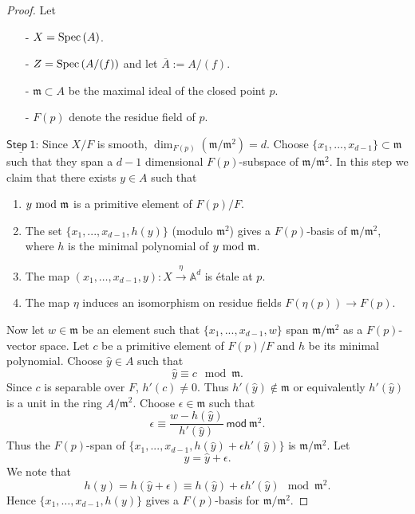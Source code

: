 \documentclass[10pt]{amsart}
\theoremstyle{plain}
\theoremstyle{definition}
\newcommand{\Spec}{{\rm Spec \,}}
\newcommand{\A}{{\mathbb A}}
\let\syn\mathsf
\newcommand{\Step}[1]{\underline{\syn{Step \ {#1}}}}
\newcommand{\scr}{\scriptscriptstyle}
\begin{document}
\begin{proof}   Let
\begin{enumerate}
\item[-] $X=\Spec(A)$.
\item[-] $Z= \Spec(A/(f))$ and let $\overline{A}:= A/(f)$. 
\item[-] $\mathfrak{m}\subset A$ be the maximal ideal of the closed point $p$.
\item[-] $F(p)$ denote the residue field of $p$. 


\end{enumerate}

\noindent $\Step{1}$:
Since $X/F$ is smooth, $\dim_{F(p)}(\mathfrak{m}/\mathfrak{m}^2)=d$. Choose $\{x_{\scr 1},...,x_{\scr d-1}\} \subset {\mathfrak m}$ such that they span a $d-1$ dimensional $F(p)$-subspace of $\mathfrak{m}/\mathfrak{m}^2$. In this step we claim that  there exists $y \in A$ such that 
\begin{enumerate}

\item $y\   {\rm mod}\  \mathfrak{m}$  is a primitive element of $ F(p)/F$.
\item The set  $\{x_1,...,x_{d-1},h(y)\}$ (modulo $\mathfrak{m}^2$) gives a $F(p)$-basis  of ${\mathfrak m}/{\mathfrak m}^2$, where $h$ is the minimal polynomial of $y\   {\rm mod}\  \mathfrak{m}$.
\item  The map $(x_1,\ldots,x_{d-1},{y}):X \xrightarrow{\eta} \A^d$ is \'{e}tale at $p$.
\item The map $\eta$ induces an isomorphism on residue fields $F(\eta(p)) \to F(p)$. 
\end{enumerate} 



Now let $w\in \mathfrak{m}$ be an element such that $\{x_{\scr 1},...,x_{\scr d-1},w\}$ span $\mathfrak{m}/\mathfrak{m}^2$ as a $F(p)$-vector space.  Let $c$ be a primitive element of $F(p)/F$ and $h$ be its minimal polynomial. Choose $\hat{y}\in A$ such that
$$\hat{y}  \equiv c \mod \mathfrak{m}.$$ Since $c$ is separable over $F$, $h'(c)\neq 0$. Thus $h'(\hat{y}) \notin \mathfrak{m}$ or equivalently $h'(\hat{y})$ is a unit in the ring $A/\mathfrak{m}^2$.
Choose $\epsilon\in \mathfrak{m}$  such that 
$$ \epsilon \equiv \frac{w-h(\hat{y})}{h'(\hat{y})} \ \syn{mod} \ \mathfrak{m}^2.$$
Thus the $F(p)$-span of $\{x_{\scr 1},...,x_{\scr d-1},h(\hat{y})+\epsilon h'(\hat{y})\}$ is   $\mathfrak{m}/\mathfrak{m}^2$.
Let
$${y}=\hat{y}+\epsilon.$$
We note that $$h({y})=h(\hat{y}+\epsilon) \equiv h(\hat{y})+\epsilon h'(\hat{y}) \mod 
\mathfrak{m}^2.$$
Hence $\{x_1,\ldots,x_{d-1},h(y)\}$ gives a $F(p)$-basis for $\mathfrak{m}/\mathfrak{m}^2$.


\end{proof}
\end{document}
